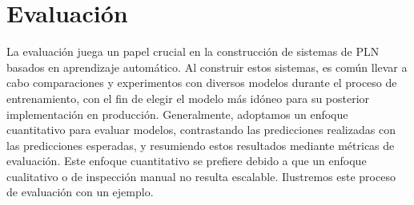 \documentclass[11pt,fleqn]{book} %
\begin{document}
\pagestyle{empty} %

\tableofcontents %


\pagestyle{fancy} %




\section{Evaluación}

La evaluación juega un papel crucial en la construcción de sistemas de PLN basados en aprendizaje automático. Al construir estos sistemas, es común llevar a cabo comparaciones y experimentos con diversos modelos durante el proceso de entrenamiento, con el fin de elegir el modelo más idóneo para su posterior implementación en producción. Generalmente, adoptamos un enfoque cuantitativo para evaluar modelos, contrastando las predicciones realizadas con las predicciones esperadas, y resumiendo estos resultados mediante métricas de evaluación. Este enfoque cuantitativo se prefiere debido a que un enfoque cualitativo o de inspección manual no resulta escalable. Ilustremos este proceso de evaluación con un ejemplo.
\end{document}
